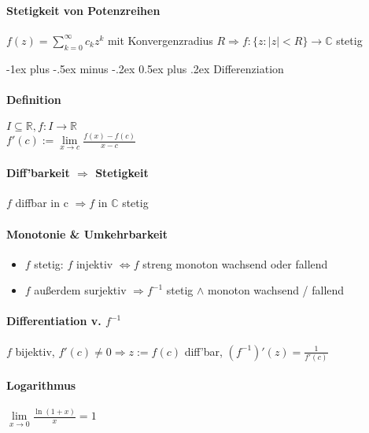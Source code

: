\documentclass[paper=a3,paper=landscape, fontsize=9pt,DIV=30]{scrartcl}
\makeatletter
\newcommand{\real}{{\mathbb{R}}}
\newcommand{\compl}{\mathbb{C}}
\renewcommand{\section}{\@startsection{section}{1}{0mm}%
  {-1ex plus -.5ex minus -.2ex}%
  {0.5ex plus .2ex}%
  {\color{blue}\normalfont\large\bfseries}}
\makeatother
\begin{document}
\begin{multicols*}{4}
  \paragraph{Stetigkeit von Potenzreihen}
  $ f(z)=\sum_{k=0}^{\infty} c_kz^k$ mit Konvergenzradius $R \Rightarrow f: \{z: \lvert z \rvert < R \} \rightarrow \compl$ stetig


  \section{Differenziation}

  \paragraph{Definition}
  $I \subseteq \real, f: I \rightarrow \real$\\
$f'(c) := \lim\limits_{x \rightarrow c} \frac{f(x)-f(c)}{x-c}$

  \paragraph{Diff'barkeit $\Rightarrow$ Stetigkeit}
  $f$ diffbar in c $\Rightarrow f$ in $\compl$ stetig

  \paragraph{Monotonie \& Umkehrbarkeit}
  \begin{itemize}
  \item $f$ stetig: $f$ injektiv $\Leftrightarrow f$ streng monoton wachsend oder fallend
  \item $f$ außerdem surjektiv $\Rightarrow f^{-1}$ stetig $\wedge$ monoton wachsend / fallend
  \end{itemize}


  \paragraph{Differentiation v. $f^{-1}$}
  $f$ bijektiv, $f'(c) \neq 0 \Rightarrow z := f(c)$ diff'bar, $(f^{-1})'(z)=\frac{1}{f'(c)}$


  \paragraph{Logarithmus}
  $\lim\limits_{x\rightarrow0} \frac{\ln(1+x)}{x}=1$



\end{multicols*}
\end{document}
